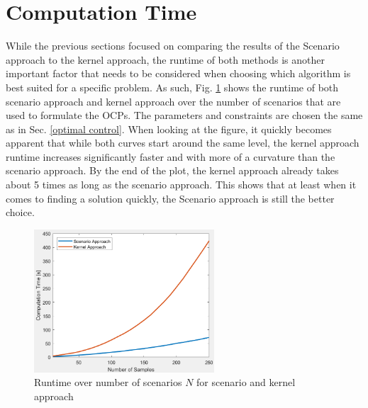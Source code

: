 \section{Computation Time} \label{computation time}

While the previous sections focused on comparing the results of the Scenario approach to the kernel approach, the runtime of both methods is another important factor that needs to be considered when choosing which algorithm is best suited for a specific problem. As such, Fig. \ref{fig:runtime_plot} shows the runtime of both scenario approach and kernel approach over the number of scenarios that are used to formulate the OCPs. The parameters and constraints are chosen the same as in Sec. \ref{optimal control}. When looking at the figure, it quickly becomes apparent that while both curves start around the same level, the kernel approach runtime increases significantly faster and with more of a curvature than the scenario approach. By the end of the plot, the kernel approach already takes about 5 times as long as the scenario approach. This shows that at least when it comes to finding a solution quickly, the Scenario approach is still the better choice.

\begin{figure}[htb]
\centering
\includegraphics[width=0.6\textwidth]{pics/computationtime_plot.png}
\caption{Runtime over number of scenarios $N$ for scenario and kernel approach}
\label{fig:runtime_plot}
\end{figure}
